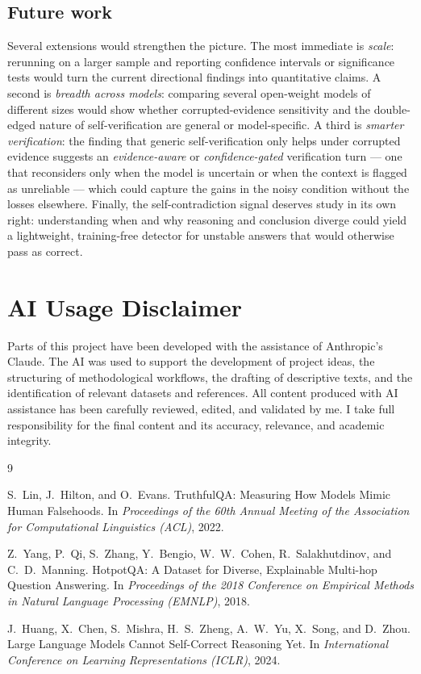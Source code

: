 \documentclass[11pt,a4paper]{article}
\begin{document}
\subsection{Future work}
Several extensions would strengthen the picture. The most immediate is
\emph{scale}: rerunning on a larger sample and reporting confidence
intervals or significance tests would turn the current directional
findings into quantitative claims. A second is \emph{breadth across
models}: comparing several open-weight models of different sizes would
show whether corrupted-evidence sensitivity and the double-edged nature
of self-verification are general or model-specific. A third is
\emph{smarter verification}: the finding that generic self-verification
only helps under corrupted evidence suggests an \emph{evidence-aware}
or \emph{confidence-gated} verification turn --- one that reconsiders
only when the model is uncertain or when the context is flagged as
unreliable --- which could capture the gains in the noisy condition
without the losses elsewhere. Finally, the self-contradiction signal
deserves study in its own right: understanding when and why reasoning
and conclusion diverge could yield a lightweight, training-free
detector for unstable answers that would otherwise pass as correct.

\section*{AI Usage Disclaimer}

Parts of this project have been developed with the assistance of
Anthropic's Claude. The AI was used to support the development of
project ideas, the structuring of methodological workflows, the
drafting of descriptive texts, and the identification of relevant
datasets and references. All content produced with AI assistance has
been carefully reviewed, edited, and validated by me. I take full
responsibility for the final content and its accuracy, relevance, and
academic integrity.

\begin{thebibliography}{9}

S.~Lin, J.~Hilton, and O.~Evans.
\newblock TruthfulQA: Measuring How Models Mimic Human Falsehoods.
\newblock In \emph{Proceedings of the 60th Annual Meeting of the
Association for Computational Linguistics (ACL)}, 2022.

Z.~Yang, P.~Qi, S.~Zhang, Y.~Bengio, W.~W.~Cohen, R.~Salakhutdinov,
and C.~D.~Manning.
\newblock HotpotQA: A Dataset for Diverse, Explainable Multi-hop
Question Answering.
\newblock In \emph{Proceedings of the 2018 Conference on Empirical
Methods in Natural Language Processing (EMNLP)}, 2018.

J.~Huang, X.~Chen, S.~Mishra, H.~S.~Zheng, A.~W.~Yu, X.~Song, and
D.~Zhou.
\newblock Large Language Models Cannot Self-Correct Reasoning Yet.
\newblock In \emph{International Conference on Learning Representations
(ICLR)}, 2024.

\end{thebibliography}
\end{document}
